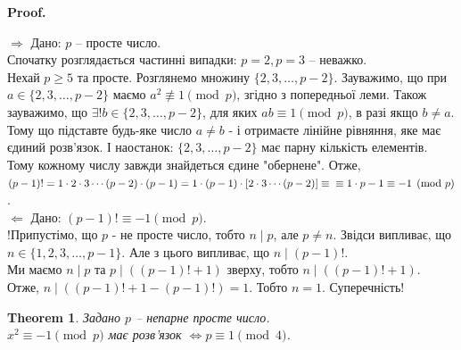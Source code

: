 \documentclass[a4paper, 10pt]{article}
\makeatletter
\theoremstyle{theoremdd}
\newtheorem{theorem}{Theorem}[subsection]
\theoremstyle{theoremdd}
\theoremstyle{theoremdd}
\theoremstyle{theoremdd}
\theoremstyle{theoremdd}
\theoremstyle{theoremdd}
\theoremstyle{theoremdd}
\theoremstyle{theoremdd}
\def\rightproof{$\boxed{\Rightarrow}$ }
\def\leftproof{$\boxed{\Leftarrow}$ }
\renewenvironment{proof}[1][Proof.\\]{\par
\pushQED{\hfill \qed}%
\normalfont \topsep6\p@\@plus6\p@\relax
\trivlist
\item\relax
{\bfseries
#1\@addpunct{.}}\hspace\labelsep\ignorespaces
}{%
\popQED\endtrivlist\@endpefalse
}
\makeatother
\begin{document}
\begin{proof}
\rightproof Дано: $p$ -- просте число.\\
Спочатку розглядається частинні випадки: $p=2,p=3$ -- неважко.\\
Нехай $p \geq 5$ та просте. Розглянемо множину $\{2,3,\dots,p-2\}$. Зауважимо, що при $a \in \{2,3,\dots,p-2\}$ маємо $a^2 \not\equiv 1 \pmod p$, згідно з попередньої леми. Також зауважимо, що $\exists ! b \in \{2,3,\dots,p-2\}$, для яких $ab \equiv 1 \pmod p$, в разі якщо $b \neq a$. Тому що підставте будь-яке число $a \neq b$ - і отримаєте лінійне рівняння, яке має єдиний розв'язок. І наостанок: $\{2,3,\dots,p-2\}$ має парну кількість елементів. Тому кожному числу завжди знайдеться єдине "обернене". Отже,\\
$(p-1)! = 1 \cdot 2 \cdot 3 \cdots (p-2) \cdot (p-1) = 1 \cdot (p-1) \cdot [2 \cdot 3 \cdots (p-2)] \equiv \\ \equiv 1 \cdot p-1 \equiv -1 \pmod p$.
\bigskip \\
\leftproof Дано: $(p-1)! \equiv -1 \pmod p$.\\
!Припустімо, що $p$ - не просте число, тобто $n \mid p$, але $p \neq n$. Звідси випливає, що $n \in \{1,2,3,\dots,p-1\}$. Але з цього випливає, що $n \mid (p-1)!$.\\
Ми маємо $n \mid p$ та $p \mid ((p-1)!+1)$ зверху, тобто $n \mid ((p-1)!+1)$.\\
Отже, $n \mid ((p-1)!+1 - (p-1)!) = 1$. Тобто $n = 1$. Суперечність!
\end{proof}

\begin{theorem}
Задано $p$ -- непарне просте число.\\
$x^2 \equiv -1 \pmod p$ має розв'язок $\iff p \equiv 1 \pmod 4$.
\end{theorem}
\end{document}
